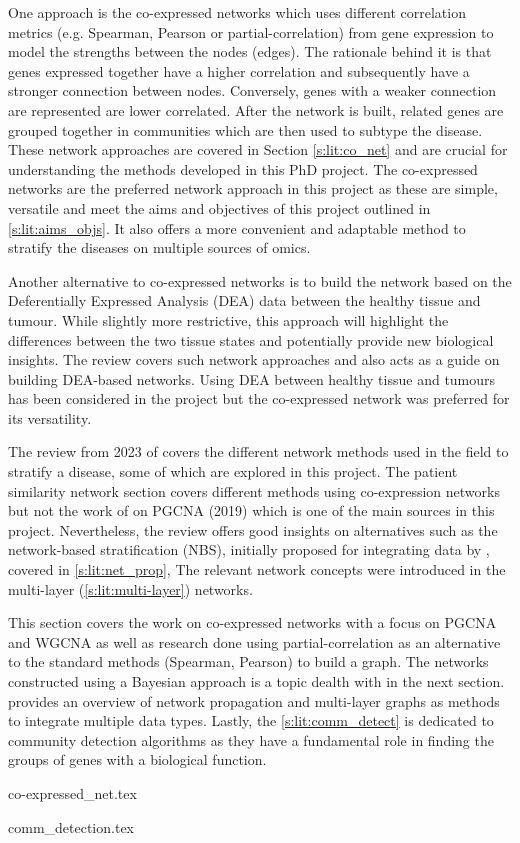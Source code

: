 One approach is the co-expressed networks which uses different correlation metrics (e.g. Spearman, Pearson or partial-correlation) from gene expression to model the strengths between the nodes (edges). The rationale behind it is that genes expressed together have a higher correlation and subsequently have a stronger connection between nodes. Conversely, genes with a weaker connection are represented are lower correlated. After the network is built, related genes are grouped together in communities which are then used to subtype the disease. These network approaches are covered in Section \ref{s:lit:co_net} and are crucial for understanding the methods developed in this PhD project. The co-expressed networks are the preferred network approach in this project as these are simple, versatile and meet the aims and objectives of this project outlined in \cref{s:lit:aims_objs}. It also offers a more convenient and adaptable method to stratify the diseases on multiple sources of omics.

Another alternative to co-expressed networks is to build the network based on the Deferentially Expressed Analysis (DEA) data between the healthy tissue and tumour. While slightly more restrictive, this approach will highlight the differences between the two tissue states and potentially provide new biological insights. The review \citet{Van_Dam2018-id} covers such network approaches and also acts as a guide on building DEA-based networks. Using DEA between healthy tissue and tumours has been considered in the project but the co-expressed network was preferred for its versatility.

The review from 2023 of \citet{Petti2023-qo} covers the different network methods used in the field to stratify a disease, some of which are explored in this project. The patient similarity network section covers different methods using co-expression networks but not the work of \citet{Care2019-ij} on PGCNA (2019) which is one of the main sources in this project. Nevertheless, the review offers good insights on alternatives such as the network-based stratification (NBS), initially proposed for integrating data by \citet{Hofree2013-ld}, covered in \cref{s:lit:net_prop}, The relevant network concepts were introduced in  the multi-layer (\cref{s:lit:multi-layer}) networks.

This section covers the work on co-expressed networks with a focus on PGCNA and WGCNA as well as research done using partial-correlation as an alternative to the standard methods (Spearman, Pearson) to build a graph. The networks constructed using a Bayesian approach is a topic dealth with in the next section.  provides an overview of network propagation and multi-layer graphs as methods to integrate multiple data types. Lastly, the \cref{s:lit:comm_detect} is dedicated to community detection algorithms as they have a fundamental role in finding the groups of genes with a biological function.

{co-expressed_net.tex}

{comm_detection.tex}





